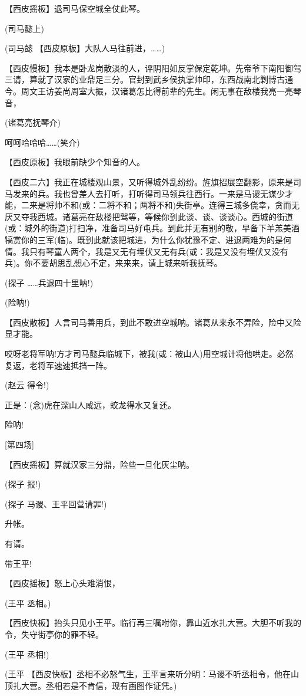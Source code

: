 【西皮摇板】退司马保空城全仗此琴。

(司马懿上)

(司马懿 【西皮原板】大队人马往前进，\ldots{}\ldots{})

【西皮慢板】我本是卧龙岗散淡的人，评阴阳如反掌保定乾坤。先帝爷下南阳御驾三请，算就了汉家的业鼎足三分。官封到武乡侯执掌帅印，东西战南北剿博古通今。周文王访姜尚周室大振，汉诸葛怎比得前辈的先生。闲无事在敌楼我亮一亮琴音，

(诸葛亮抚琴介)

呵呵哈哈哈\ldots{}\ldots{}(笑介)

【西皮原板】我眼前缺少个知音的人。

【西皮二六】我正在城楼观山景，又听得城外乱纷纷。旌旗招展空翻影，原来是司马发来的兵。我也曾差人去打听，打听得司马领兵往西行。一来是马谡无谋少才能，二来是将帅不和(或：二将不和；两将不和)失街亭。连得三城多侥幸，贪而无厌又夺我西城。诸葛亮在敌楼把驾等，等候你到此谈、谈、谈谈心。西城的街道(或：城外的街道)打扫净，准备司马好屯兵。到此并无有别的敬，早备下羊羔美酒犒赏你的三军(临)。既到此就该把城进，为什么你犹豫不定、进退两难为的是何情。我只有琴童人两个，我是又无有埋伏又无有兵(或：我是又没有埋伏又没有兵)。你不要胡思乱想心不定，来来来，请上城来听我抚琴。

(探子 \ldots{}\ldots{}兵退四十里呐!)

(险呐!)

【西皮散板】人言司马善用兵，到此不敢进空城呐。诸葛从来永不弄险，险中又险显才能。

哎呀老将军呐!方才司马懿兵临城下，被我(或：被山人)用空城计将他哄走。必然复返，老将军速速抵挡一阵。

(赵云 得令!)

正是：(念)虎在深山人咸远，蛟龙得水又复还。

险呐!

{[}第四场{]}

【西皮摇板】算就汉家三分鼎，险些一旦化灰尘呐。

(探子 报!)

(探子 马谡、王平回营请罪!)

升帐。

有请。

带王平!

【西皮摇板】怒上心头难消恨，

(王平 丞相。)

【西皮快板】抬头只见小王平。临行再三嘱咐你，靠山近水扎大营。大胆不听我的令，失守街亭你的罪不轻。

(王平 丞相!)

(王平
【西皮快板】丞相不必怒气生，王平言来听分明：马谡不听丞相令，他在山顶扎大营。丞相若是不肯信，现有画图作证凭。)

